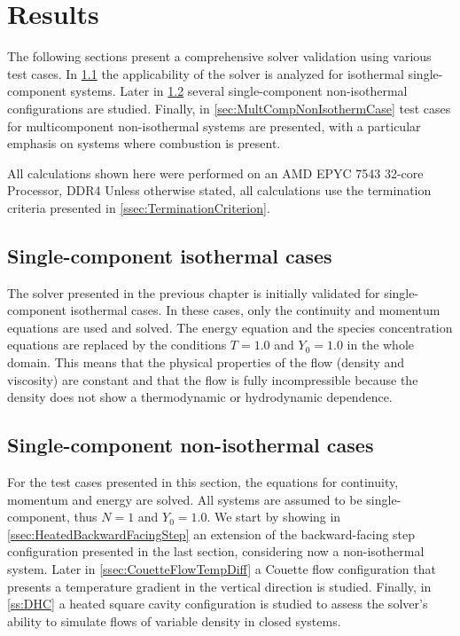 \chapter{Results}	\label{ch:results}
\glsresetall
The following sections present a comprehensive solver validation using various test cases. In \cref{sec:SingleCompIsotCase} the applicability of the solver is analyzed for isothermal single-component systems. Later in \cref{sec:SinCompNonIsothermCase} several single-component non-isothermal configurations are studied. Finally, in \cref{sec:MultCompNonIsothermCase} test cases for multicomponent non-isothermal systems are presented, with a particular emphasis on systems where combustion is present.

All calculations shown here were performed on an AMD EPYC 7543 32-core Processor, DDR4 %
Unless otherwise stated, all calculations use the termination criteria presented in \cref{ssec:TerminationCriterion}.
\section{Single-component isothermal cases}\label{sec:SingleCompIsotCase}
The solver presented in the previous chapter is initially validated for single-component isothermal cases. In these cases, only the continuity and momentum equations are used and solved. The energy equation and the species concentration equations are replaced by the conditions $T = 1.0$ and $Y_0 = 1.0$ in the whole domain. This means that the physical properties of the flow (density and viscosity) are constant and that the flow is fully incompressible because the density does not show a thermodynamic or hydrodynamic dependence.


\section{Single-component non-isothermal cases} \label{sec:SinCompNonIsothermCase}
For the test cases presented in this section, the equations for continuity, momentum and energy are solved. All systems are assumed to be single-component, thus $N = 1$ and $Y_0 = 1.0$. We start by showing in \cref{ssec:HeatedBackwardFacingStep} an extension of the backward-facing step configuration presented in the last section, considering now a non-isothermal system. Later in \cref{ssec:CouetteFlowTempDiff} a Couette flow configuration that presents a temperature gradient in the vertical direction is studied. Finally, in \cref{ss:DHC} a heated square cavity configuration is studied to assess the solver's ability to simulate flows of variable density in closed systems.




